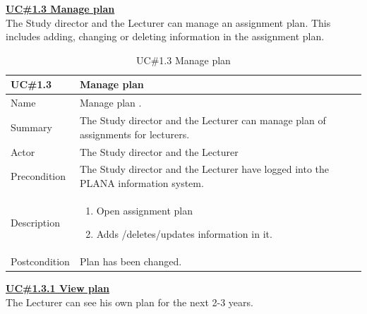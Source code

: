 \documentclass{scrartcl}
\begin{document}
	\newpage          
	          

\textbf{\underline{UC\#1.3  Manage plan}}  \\
The Study director and the Lecturer can manage an assignment plan. This includes adding, changing or deleting information in the assignment plan.   \\ 

\begin{table}[H]
\begin{center}
\begin{tabular}{| p{2.5cm}| p{12.5cm} |}
\hline
\textbf{UC\#1.3 } & \textbf{Manage plan } \\
\hline
Name  &  Manage plan .\\ \hline
	         Summary  & The Study director and the Lecturer can manage plan of assignments for lecturers. \\ \hline
	         Actor   & The Study director and the Lecturer \\ \hline
	         Precondition & The Study director and the Lecturer  have logged into the PLANA information system. \\ \hline
	         Description & 
	         \begin{enumerate}
	   		\item Open assignment plan
			\item Adds /deletes/updates information in it.
			
			\end{enumerate}
	             \\ \hline	        
	          Postcondition &  Plan has been changed.\\ \hline
	           
\end{tabular}
\end{center}
\caption{UC\#1.3  Manage plan}
\label{table2}
\end{table}

\textbf{\underline{UC\#1.3.1 View plan}}\\
The Lecturer can see his own plan for the next 2-3 years.
\end{document}
